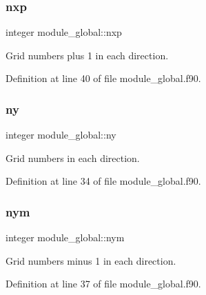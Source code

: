 \mbox{\label{namespacemodule__global_a46d777f91db627ffda250b59c2ace26f}} 
\subsubsection{\texorpdfstring{nxp}{nxp}}
{\footnotesize\ttfamily integer module\+\_\+global\+::nxp}



Grid numbers plus 1 in each direction. 



Definition at line 40 of file module\+\_\+global.\+f90.

\mbox{\label{namespacemodule__global_a77c7285b11685f1b1cf6a0bee5b1237f}} 
\subsubsection{\texorpdfstring{ny}{ny}}
{\footnotesize\ttfamily integer module\+\_\+global\+::ny}



Grid numbers in each direction. 



Definition at line 34 of file module\+\_\+global.\+f90.

\mbox{\label{namespacemodule__global_abe5a3dedbee692c61acb0614f80d7584}} 
\subsubsection{\texorpdfstring{nym}{nym}}
{\footnotesize\ttfamily integer module\+\_\+global\+::nym}



Grid numbers minus 1 in each direction. 



Definition at line 37 of file module\+\_\+global.\+f90.

\mbox{\label{namespacemodule__global_ac5231664c2f5fe4f769a06df674e4292}} 
